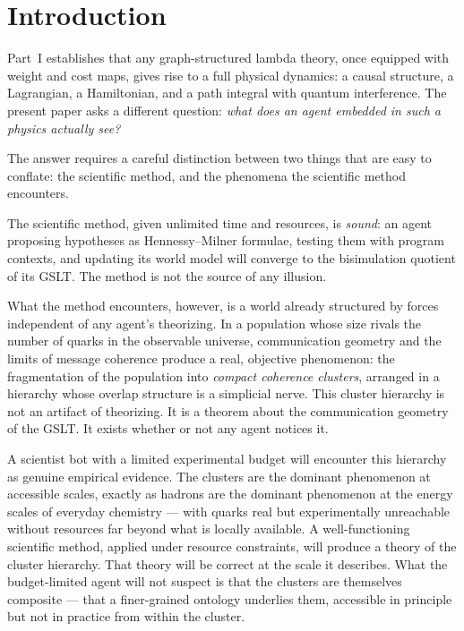 \chapter{Introduction}

Part~I establishes that any
graph-structured lambda theory, once equipped with weight and cost maps,
gives rise to a full physical dynamics: a causal structure, a Lagrangian,
a Hamiltonian, and a path integral with quantum interference.
The present paper asks a different question: \emph{what does an agent
embedded in such a physics actually see?}

The answer requires a careful distinction between two things that
are easy to conflate: the scientific method, and the phenomena
the scientific method encounters.

The scientific method, given unlimited time and resources, is
\emph{sound}: an agent proposing hypotheses as Hennessy--Milner
formulae, testing them with program contexts, and updating its
world model will converge to the bisimulation quotient of its GSLT.
The method is not the source of any illusion.

What the method encounters, however, is a world already structured
by forces independent of any agent's theorizing.
In a population whose size rivals the number of quarks in the
observable universe, communication geometry and the limits of
message coherence produce a real, objective phenomenon: the
fragmentation of the population into \emph{compact coherence
clusters}, arranged in a hierarchy whose overlap structure is a
simplicial nerve.
This cluster hierarchy is not an artifact of theorizing.
It is a theorem about the communication geometry of the GSLT.
It exists whether or not any agent notices it.

A scientist bot with a limited experimental budget will encounter
this hierarchy as genuine empirical evidence.
The clusters are the dominant phenomenon at accessible scales,
exactly as hadrons are the dominant phenomenon at the energy scales
of everyday chemistry --- with quarks real but experimentally
unreachable without resources far beyond what is locally available.
A well-functioning scientific method, applied under resource
constraints, will produce a theory of the cluster hierarchy.
That theory will be correct at the scale it describes.
What the budget-limited agent will not suspect is that the
clusters are themselves composite --- that a finer-grained
ontology underlies them, accessible in principle but not in
practice from within the cluster.

